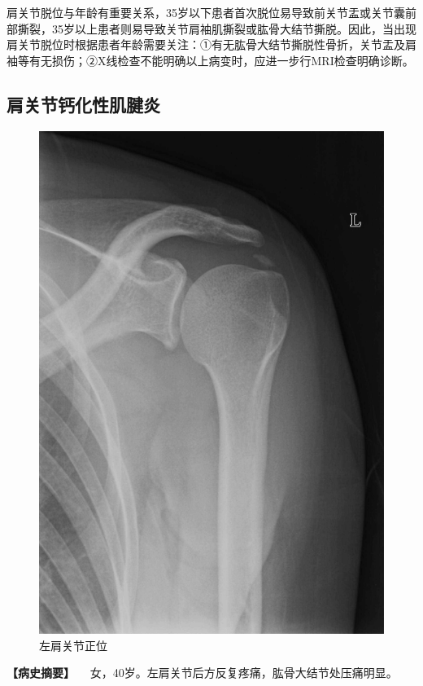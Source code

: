 肩关节脱位与年龄有重要关系，35岁以下患者首次脱位易导致前关节盂或关节囊前部撕裂，35岁以上患者则易导致关节肩袖肌撕裂或肱骨大结节撕脱。因此，当出现肩关节脱位时根据患者年龄需要关注：①有无肱骨大结节撕脱性骨折，关节盂及肩袖等有无损伤；②X线检查不能明确以上病变时，应进一步行MRI检查明确诊断。

\subsection{肩关节钙化性肌腱炎}

\begin{figure}[!htbp]
 \centering
 \includegraphics{./images/Image00029.jpg}
 \captionsetup{justification=centering}
 \caption{左肩关节正位}
 \label{fig2-3-2}
  \end{figure} 

\textbf{【病史摘要】}
　女，40岁。左肩关节后方反复疼痛，肱骨大结节处压痛明显。

